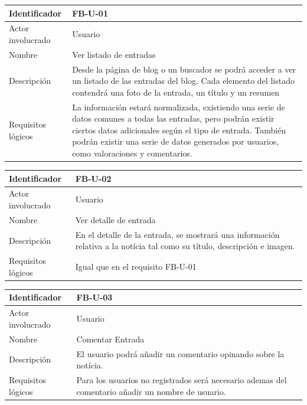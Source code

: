 \begin{table}[!htbp]
\centering
\begin{tabular}{|p{3cm}|p{10cm}|}
\hline
Identificador & FB-U-01 \\ \hline
Actor involucrado & Usuario \\ \hline
Nombre & Ver listado de entradas \\ \hline
Descripción & Desde la página de blog o un buscador se podrá acceder a ver un listado de las entradas del blog. Cada elemento del listado contendrá una foto de la entrada, un título y un resumen \\ \hline
Requisitos lógicos & La información estará normalizada, existiendo una serie de datos comunes a todas las entradas, pero podrán existir ciertos datos adicionales según el tipo de entrada. También podrán existir una serie de datos generados por usuarios, como valoraciones y comentarios. \\ \hline
\end{tabular}
\end{table}


\begin{table}[!htbp]
\centering
\begin{tabular}{|p{3cm}|p{10cm}|}
\hline
Identificador & FB-U-02 \\ \hline
Actor involucrado & Usuario \\ \hline
Nombre & Ver detalle de entrada \\ \hline
Descripción & En el detalle de la entrada, se mostrará una información relativa a la notícia tal como su título, descripción e imagen. \\ \hline
Requisitos lógicos & Igual que en el requisito FB-U-01 \\ \hline
\end{tabular}
\end{table}


\begin{table}[!htbp]
\centering
\begin{tabular}{|p{3cm}|p{10cm}|}
\hline
Identificador & FB-U-03 \\ \hline
Actor involucrado & Usuario \\ \hline
Nombre & Comentar Entrada\\ \hline
Descripción & El usuario podrá añadir un comentario opinando sobre la notícia.  \\ \hline
Requisitos lógicos & Para los usuarios no registrados será necesario ademas del comentario añadir un nombre de usuario. \\ \hline
\end{tabular}
\end{table}

